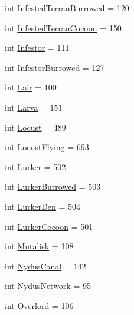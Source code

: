 \begin{DoxyCompactItemize}
\item 
int \mbox{\hyperlink{classpysc2_1_1lib_1_1units_1_1_zerg_a2d07059eddcc8a79d0ca71c4eabe5f7c}{Infested\+Terran\+Burrowed}} = 120
\item 
int \mbox{\hyperlink{classpysc2_1_1lib_1_1units_1_1_zerg_a4a5846a524c68ea84a4c17af7804a3fc}{Infested\+Terran\+Cocoon}} = 150
\item 
int \mbox{\hyperlink{classpysc2_1_1lib_1_1units_1_1_zerg_a4417b91fbdee3d38d0db4b3e6b37d520}{Infestor}} = 111
\item 
int \mbox{\hyperlink{classpysc2_1_1lib_1_1units_1_1_zerg_a5dc64b9cdaa3d4279d784743bfe9e4a0}{Infestor\+Burrowed}} = 127
\item 
int \mbox{\hyperlink{classpysc2_1_1lib_1_1units_1_1_zerg_ad88574d1a7e138fe024bae56fc755c70}{Lair}} = 100
\item 
int \mbox{\hyperlink{classpysc2_1_1lib_1_1units_1_1_zerg_ab5ec4510c9251eb341e64c7588d1d042}{Larva}} = 151
\item 
int \mbox{\hyperlink{classpysc2_1_1lib_1_1units_1_1_zerg_a77b5c2a57a35736a73096602be7893ef}{Locust}} = 489
\item 
int \mbox{\hyperlink{classpysc2_1_1lib_1_1units_1_1_zerg_ada0e739b7c71141d2131a8dd5581c419}{Locust\+Flying}} = 693
\item 
int \mbox{\hyperlink{classpysc2_1_1lib_1_1units_1_1_zerg_ac6e8a71093aa9e88dfdf77271f89fc4a}{Lurker}} = 502
\item 
int \mbox{\hyperlink{classpysc2_1_1lib_1_1units_1_1_zerg_a469d9ee046e545e02b5c49ea02484b81}{Lurker\+Burrowed}} = 503
\item 
int \mbox{\hyperlink{classpysc2_1_1lib_1_1units_1_1_zerg_a673e1da5c2ede594df3c0eda9fb83f81}{Lurker\+Den}} = 504
\item 
int \mbox{\hyperlink{classpysc2_1_1lib_1_1units_1_1_zerg_a68d5cf941b62245ae9e68e726a3cadfd}{Lurker\+Cocoon}} = 501
\item 
int \mbox{\hyperlink{classpysc2_1_1lib_1_1units_1_1_zerg_a552b1ba7008dda7ec7e9a660443aa9b0}{Mutalisk}} = 108
\item 
int \mbox{\hyperlink{classpysc2_1_1lib_1_1units_1_1_zerg_a2ea5611110fdef42b2131e952291ca07}{Nydus\+Canal}} = 142
\item 
int \mbox{\hyperlink{classpysc2_1_1lib_1_1units_1_1_zerg_a709d2e547e2274b6f75bd75fc2dd9c2b}{Nydus\+Network}} = 95
\item 
int \mbox{\hyperlink{classpysc2_1_1lib_1_1units_1_1_zerg_a981687f44b59cb78fec24a05b7435acb}{Overlord}} = 106
\item 

\end{DoxyCompactItemize}

